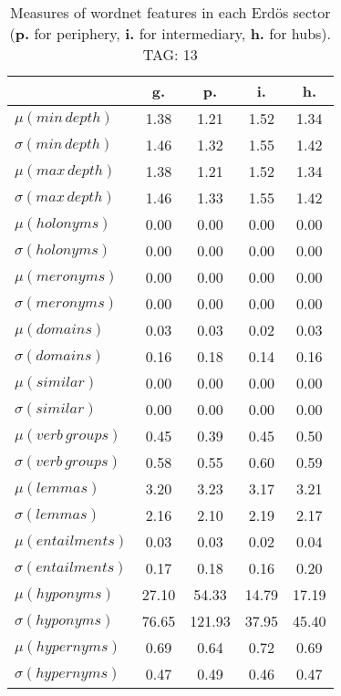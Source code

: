 \begin{table}[h!]
\begin{center}
\begin{tabular}{| l | c | c | c | c |}\hline
 & g. & p. & i. & h. \\\hline
$\mu(min\,depth)$ & 1.38  & 1.21  & 1.52  & 1.34 \\\hline
$\sigma(min\,depth)$ & 1.46  & 1.32  & 1.55  & 1.42 \\\hline
$\mu(max\,depth)$ & 1.38  & 1.21  & 1.52  & 1.34 \\\hline
$\sigma(max\,depth)$ & 1.46  & 1.33  & 1.55  & 1.42 \\\hline
$\mu(holonyms)$ & 0.00  & 0.00  & 0.00  & 0.00 \\\hline
$\sigma(holonyms)$ & 0.00  & 0.00  & 0.00  & 0.00 \\\hline
$\mu(meronyms)$ & 0.00  & 0.00  & 0.00  & 0.00 \\\hline
$\sigma(meronyms)$ & 0.00  & 0.00  & 0.00  & 0.00 \\\hline
$\mu(domains)$ & 0.03  & 0.03  & 0.02  & 0.03 \\\hline
$\sigma(domains)$ & 0.16  & 0.18  & 0.14  & 0.16 \\\hline
$\mu(similar)$ & 0.00  & 0.00  & 0.00  & 0.00 \\\hline
$\sigma(similar)$ & 0.00  & 0.00  & 0.00  & 0.00 \\\hline
$\mu(verb\,groups)$ & 0.45  & 0.39  & 0.45  & 0.50 \\\hline
$\sigma(verb\,groups)$ & 0.58  & 0.55  & 0.60  & 0.59 \\\hline
$\mu(lemmas)$ & 3.20  & 3.23  & 3.17  & 3.21 \\\hline
$\sigma(lemmas)$ & 2.16  & 2.10  & 2.19  & 2.17 \\\hline
$\mu(entailments)$ & 0.03  & 0.03  & 0.02  & 0.04 \\\hline
$\sigma(entailments)$ & 0.17  & 0.18  & 0.16  & 0.20 \\\hline
$\mu(hyponyms)$ & 27.10  & 54.33  & 14.79  & 17.19 \\\hline
$\sigma(hyponyms)$ & 76.65  & 121.93  & 37.95  & 45.40 \\\hline
$\mu(hypernyms)$ & 0.69  & 0.64  & 0.72  & 0.69 \\\hline
$\sigma(hypernyms)$ & 0.47  & 0.49  & 0.46  & 0.47 \\\hline
\end{tabular}
\caption{Measures of wordnet features in each Erd\"os sector ({{\bf p.}} for periphery, {{\bf i.}} for intermediary, {{\bf h.}} for hubs). TAG: 13}
\end{center}
\end{table}